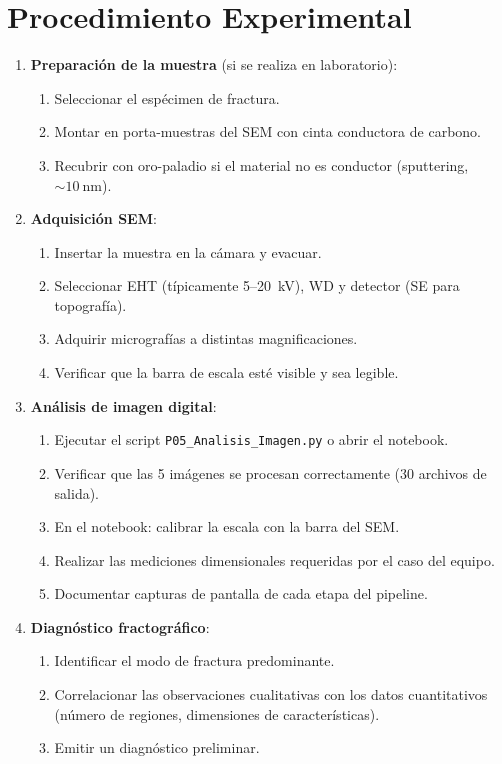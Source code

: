 \documentclass[12pt,a4paper]{article}
\begin{document}
\section{Procedimiento Experimental}
\label{sec:procedimiento}

\begin{enumerate}
	\item \textbf{Preparación de la muestra} (si se realiza en laboratorio):
	      \begin{enumerate}
		      \item Seleccionar el espécimen de fractura.
		      \item Montar en porta-muestras del SEM con cinta conductora de
		            carbono.
		      \item Recubrir con oro-paladio si el material no es conductor
		            (sputtering, $\sim\!\SI{10}{\nm}$).
	      \end{enumerate}

	\item \textbf{Adquisición SEM}:
	      \begin{enumerate}
		      \item Insertar la muestra en la cámara y evacuar.
		      \item Seleccionar EHT (típicamente 5--20~kV), WD y detector (SE
		            para topografía).
		      \item Adquirir micrografías a distintas magnificaciones.
		      \item Verificar que la barra de escala esté visible y sea legible.
	      \end{enumerate}

	\item \textbf{Análisis de imagen digital}:
	      \begin{enumerate}
		      \item Ejecutar el script \texttt{P05\_Analisis\_Imagen.py} o abrir
		            el notebook.
		      \item Verificar que las 5 imágenes se procesan correctamente
		            (30 archivos de salida).
		      \item En el notebook: calibrar la escala con la barra del SEM.
		      \item Realizar las mediciones dimensionales requeridas por el caso
		            del equipo.
		      \item Documentar capturas de pantalla de cada etapa del pipeline.
	      \end{enumerate}

	\item \textbf{Diagnóstico fractográfico}:
	      \begin{enumerate}
		      \item Identificar el modo de fractura predominante.
		      \item Correlacionar las observaciones cualitativas con los datos
		            cuantitativos (número de regiones, dimensiones de
		            características).
		      \item Emitir un diagnóstico preliminar.
	      \end{enumerate}
\end{enumerate}
\end{document}
